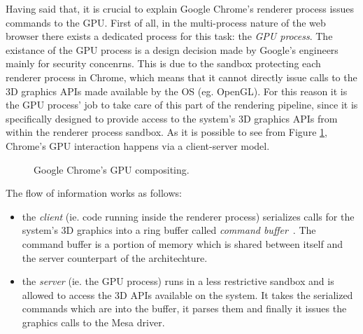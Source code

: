 Having said that, it is crucial to explain Google Chrome's renderer process issues
commands to the GPU. First of all, in the multi-process nature of the web browser
there exists a dedicated process for this task: the \emph{GPU process}. The existance
of the GPU process is a design decision made by Google's engineers mainly for
security concenrns. This is due to the sandbox protecting each renderer process
in Chrome, which means that it cannot directly issue calls to the 3D graphics APIs
made available by the OS (eg. OpenGL). For this reason it is the GPU process' job
to take care of this part of the rendering pipeline, since it is specifically
designed to provide access to the system's 3D graphics APIs from within the renderer
process sandbox.
As it is possible to see from Figure \ref{img:chrome_gpu_compositing}, Chrome's
GPU interaction happens via a client-server model.
\begin{figure}[!htb]
    \caption{Google Chrome's GPU compositing.}
    \label{img:chrome_gpu_compositing}
\end{figure}

The flow of information works as follows:
\begin{itemize}
    \item the \emph{client} (ie. code running inside the renderer process) serializes
        calls for the system's 3D graphics into a ring buffer called
        \emph{command buffer}~\cite{gpucommandbffer}. The command buffer is a portion
        of memory which is shared between itself and the server counterpart of
        the architechture.
    \item the \emph{server} (ie. the GPU process) runs in a less restrictive sandbox
        and is allowed to access the 3D APIs available on the system. It takes the
        serialized commands which are into the buffer, it parses them and finally it
        issues the graphics calls to the Mesa driver.
\end{itemize}
